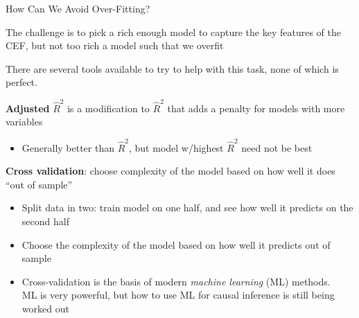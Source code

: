 \documentclass[11pt,english,handout]{beamer}
\newenvironment{wideitemize}{\itemize\addtolength{\itemsep}{10pt}}{\enditemize}
\begin{document}
\begin{frame}{How Can We Avoid Over-Fitting?}
	\begin{wideitemize}
		
		\item
		The challenge is to pick a rich enough model to capture the key features of the CEF, but not too rich a model such that we overfit
		
		\pause
		\item
		There are several tools available to try to help with this task, none of which is perfect. 
		
		\pause
		\item
		\textbf{Adjusted} $\hat{R}^2$ is a modification to $\hat{R}^2$ that adds a penalty for models with more variables
		\begin{itemize}
			\item
			Generally better than $\hat{R}^2$, but model w/highest $\hat{R}^2$ need not be best
		\end{itemize}	
		
		\pause
		\item
		\textbf{Cross validation}: choose complexity of the model based on how well it does ``out of sample'' \pause
		\begin{itemize}
			\item 
			Split data in two: train model on one half, and see how well it predicts on the second half
			
			\item
			Choose the complexity of the model based on how well it predicts out of sample
			
			\pause
			\item
			Cross-validation is the basis of modern \textit{machine learning} (ML) methods. \\
			ML is very powerful, but how to use ML for causal inference is still being worked out
		\end{itemize}
		
	\end{wideitemize}		
\end{frame}	
\end{document}
